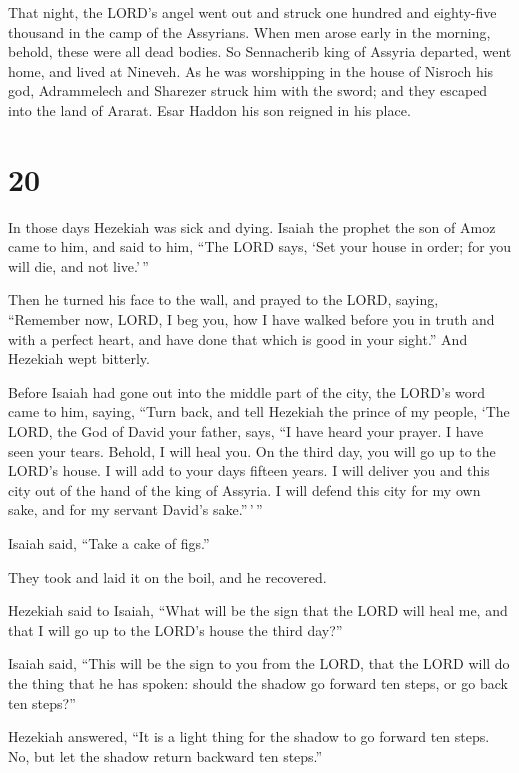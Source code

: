  That night, the LORD's angel went out and struck one
hundred and eighty-five thousand in the camp of the Assyrians. When men
arose early in the morning, behold, these were all dead bodies.
 So Sennacherib king of Assyria departed, went home, and
lived at Nineveh.  As he was worshipping in the house of
Nisroch his god, Adrammelech and Sharezer struck him with the sword; and
they escaped into the land of Ararat. Esar Haddon his son reigned in his
place.

\hypertarget{section-19}{%
\section{20}\label{section-19}}

 In those days Hezekiah was sick and dying. Isaiah the
prophet the son of Amoz came to him, and said to him, ``The LORD says,
`Set your house in order; for you will die, and not live.'\,''

 Then he turned his face to the wall, and prayed to the
LORD, saying,  ``Remember now, LORD, I beg you, how I have
walked before you in truth and with a perfect heart, and have done that
which is good in your sight.'' And Hezekiah wept bitterly.

 Before Isaiah had gone out into the middle part of the
city, the LORD's word came to him, saying,  ``Turn back,
and tell Hezekiah the prince of my people, `The LORD, the God of David
your father, says, ``I have heard your prayer. I have seen your tears.
Behold, I will heal you. On the third day, you will go up to the LORD's
house.  I will add to your days fifteen years. I will
deliver you and this city out of the hand of the king of Assyria. I will
defend this city for my own sake, and for my servant David's
sake.''\,'\,''

 Isaiah said, ``Take a cake of figs.''

They took and laid it on the boil, and he recovered.

 Hezekiah said to Isaiah, ``What will be the sign that the
LORD will heal me, and that I will go up to the LORD's house the third
day?''

 Isaiah said, ``This will be the sign to you from the
LORD, that the LORD will do the thing that he has spoken: should the
shadow go forward ten steps, or go back ten steps?''

 Hezekiah answered, ``It is a light thing for the shadow
to go forward ten steps. No, but let the shadow return backward ten
steps.''


